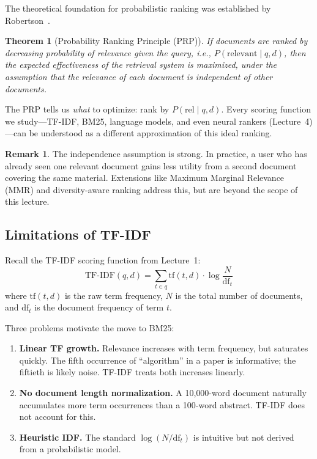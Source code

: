 \documentclass[11pt,a4paper]{article}
\theoremstyle{definition}
\newtheorem{remark}{Remark}[section]
\theoremstyle{plain}
\newtheorem{theorem}{Theorem}[section]
\begin{document}
The theoretical foundation for probabilistic ranking was established by Robertson~\cite{robertson1977probability}.

\begin{theorem}[Probability Ranking Principle (PRP)]
If documents are ranked by decreasing probability of relevance given the query, i.e., $P(\text{relevant} \mid q, d)$, then the expected effectiveness of the retrieval system is maximized, under the assumption that the relevance of each document is independent of other documents.
\end{theorem}

The PRP tells us \emph{what} to optimize: rank by $P(\text{rel} \mid q, d)$. Every scoring function we study---TF-IDF, BM25, language models, and even neural rankers (Lecture~4)---can be understood as a different approximation of this ideal ranking.

\begin{remark}
The independence assumption is strong. In practice, a user who has already seen one relevant document gains less utility from a second document covering the same material. Extensions like Maximum Marginal Relevance (MMR) and diversity-aware ranking address this, but are beyond the scope of this lecture.
\end{remark}

\subsection{Limitations of TF-IDF}

Recall the TF-IDF scoring function from Lecture~1:
\begin{equation}
\text{TF-IDF}(q, d) = \sum_{t \in q} \text{tf}(t, d) \cdot \log\frac{N}{\text{df}_t}
\end{equation}
where $\text{tf}(t,d)$ is the raw term frequency, $N$ is the total number of documents, and $\text{df}_t$ is the document frequency of term $t$.

Three problems motivate the move to BM25:

\begin{enumerate}
    \item \textbf{Linear TF growth.} Relevance increases with term frequency, but saturates quickly. The fifth occurrence of ``algorithm'' in a paper is informative; the fiftieth is likely noise. TF-IDF treats both increases linearly.
    
    \item \textbf{No document length normalization.} A 10{,}000-word document naturally accumulates more term occurrences than a 100-word abstract. TF-IDF does not account for this.
    
    \item \textbf{Heuristic IDF.} The standard $\log(N/\text{df}_t)$ is intuitive but not derived from a probabilistic model.
\end{enumerate}
\end{document}
